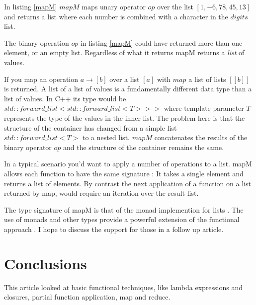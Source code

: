 \documentclass[12pt,fleqn]{article}
\begin{document}
In listing \ref{mapM} $mapM$ maps unary operator $op$ over the list $[1,-6,78,45,13]$ and returns a list where each number is combined with  a character in the $digits$ list. 
%
\begin{comment}
\begin{lstlisting}[caption=comparing with map, label=mapMvsmap] 
[...]
  auto res = map(op, std::forward_list<int>({1,-6,23,78,45,13}));
  
  for (auto& el : res) {
    std::cout << "[";
    map(show, el);
    std::cout << "], ";
  }
  //prints :[(1,b),], [(-6,g),], [(23,d),], [(78,i),], [(45,f),], [(13,d),]
\end{lstlisting}
%
\end{comment}
%
%
The binary operation $op$ in listing \ref{mapM} could have returned more than one element, or an empty list.
Regardless of what it returns mapM returns a {\em list} of values.

If you map an operation $a \rightarrow [b]$ over a list $[a]$ with $map$ a list of lists $[[b]]$ is returned. %
A list of a list of values is a fundamentally different data type than a list of values. 
In C++ its type would be $std::forward\_list<std::forward\_list<T>>>$ where template parameter $T$ represents the type of the values in the inner list.
The problem here is that the structure of the container has changed from a simple list $std::forward\_list<T>$ to a nested list.
$mapM$ concatenates the results of the binary operator $op$ and the structure of the container remains the same.

In a typical scenario you'd want to apply a number of operations to a list.
mapM allows each function to have the same signature : It takes a single element and returns a list of elements.
By contrast the next application of a function on a list returned by map, would require an iteration over the result list.

The type signature of mapM is that of the monad implemention for lists \cite{bird, lipovaca}.
The use of monads and other types provide a powerful extension of the functional approach \cite{yorgey}.
I hope to discuss the support for those in a follow up article.

\section*{Conclusions}
%
This article looked at basic functional techniques, like lambda expressions and closures, partial function application, map and reduce.
\end{document}
